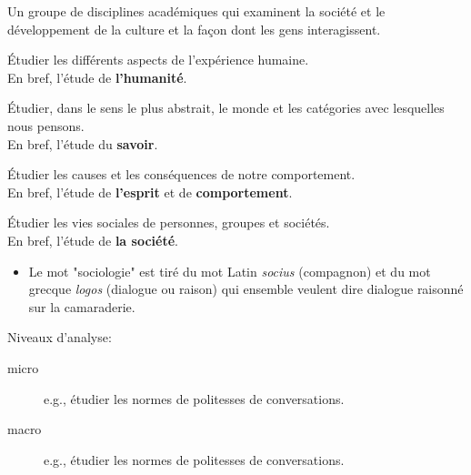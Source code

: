 \documentclass[10pt, french]{article}
\begin{document}
\begin{multicols*}{2}

\begin{definitionNOHFILL}
Un groupe de disciplines académiques qui examinent la société et le développement de la culture et la façon dont les gens interagissent.
\end{definitionNOHFILL}

\begin{definitionNOHFILLsub}[Anthropologie]
Étudier les différents aspects de l'expérience humaine.\\
En bref, l'étude de \textbf{l'humanité}.

\end{definitionNOHFILLsub}

\begin{definitionNOHFILLsub}[Philosophie]
Étudier, dans le sens le plus abstrait, le monde et les catégories avec lesquelles nous pensons.\\
En bref, l'étude du \textbf{savoir}.

\end{definitionNOHFILLsub}

\begin{definitionNOHFILLsub}[Psychologie]
Étudier les causes et les conséquences de notre comportement.\\
En bref, l'étude de \textbf{l'esprit} et de \textbf{comportement}.

\end{definitionNOHFILLsub}

\begin{definitionNOHFILLsub}[Sociologie]
Étudier les vies sociales de personnes, groupes et sociétés.\\
En bref, l'étude de \textbf{la société}.
\tcbline
\begin{itemize}
	\item	Le mot "sociologie" est tiré du mot Latin \textit{socius} (compagnon) et du mot grecque \textit{logos} (dialogue ou raison) qui ensemble veulent dire dialogue raisonné sur la camaraderie.
\end{itemize}
\end{definitionNOHFILLsub}

Niveaux d'analyse:
\begin{description}
	\item[micro]	e.g., étudier les normes de politesses de conversations.
	\item[macro]e.g., étudier les normes de politesses de conversations.
\end{description}

\end{multicols*}
\end{document}
